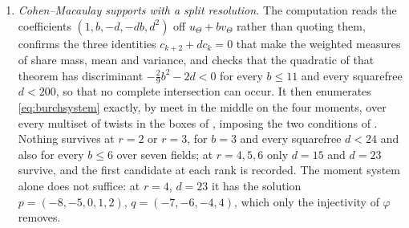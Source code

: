 \begin{enumerate}[label=\textup{(\Roman*)},leftmargin=*]
\item \emph{Cohen--Macaulay supports with a split resolution.} The
  computation reads the coefficients $(1,b,-d,-db,d^{2})$ off $u_{\Theta}+bv_{\Theta}$ rather than quoting them,
  confirms the three identities $c_{k+2}+dc_{k}=0$ that make the weighted
  measures of  share mass, mean and variance, and checks that
  the quadratic of that theorem has discriminant $-\tfrac29b^{2}-2d<0$ for
  every $b\le11$ and every squarefree $d<200$, so that no complete
  intersection can occur. It then enumerates \eqref{eq:burchsystem} exactly,
  by meet in the middle on the four moments, over every multiset of twists in
  the boxes of , imposing the two conditions of
  . Nothing survives at $r=2$ or $r=3$, for $b=3$ and
  every squarefree $d<24$ and also for every $b\le6$ over seven fields; at
  $r=4,5,6$ only $d=15$ and $d=23$ survive, and the first candidate at each
  rank is recorded. The moment system alone does not suffice: at $r=4$,
  $d=23$ it has the solution $p=(-8,-5,0,1,2)$, $q=(-7,-6,-4,4)$, which only
  the injectivity of $\varphi$ removes.


\end{enumerate}

